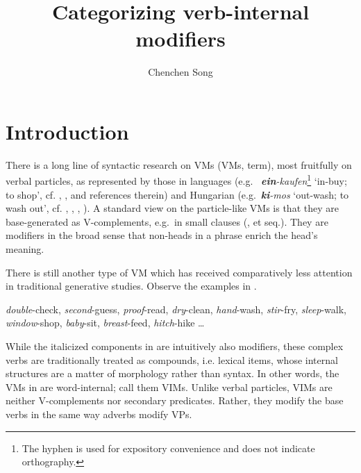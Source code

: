 \documentclass[output=paper]{langsci/langscibook}
\author{Chenchen Song\affiliation{University of Cambridge}}
\title{Categorizing verb-internal modifiers}
\begin{document}
\glsresetall

\section{Introduction}\label{sec1}

There is a long line of syntactic research on \glsdesc{VM}s
(\glspl{VM},  term), most fruitfully on verbal particles,
as represented by those in  languages (e.g.\ 
\textit{\textbf{ein}-kaufen}\footnote{The hyphen is used for expository
convenience and does not indicate orthography.} `in-buy; to shop', cf.
\citealt{DeheEtal2002}, \citealt{Haiden2006}, and references therein) and
Hungarian (e.g.\ \textit{\textbf{ki}-mos} `out-wash; to wash out', cf.
\citealt{Kiss1987}, \citeyear{Kiss2002}, \citeyear{Kiss2008},
\citealt{Hegedus2013}). A standard view on the particle-like \glspl{VM} is that they
are base-generated as V-complements, e.g.\ in small clauses
(\citealt{Taraldsen1983}, \citealt{Kayne1985} et seq.). They are
modifiers in the broad sense that non-heads in a phrase enrich the head's
meaning.

There is still another type of \gls{VM} which has received comparatively less
attention in traditional generative studies. Observe the examples in
.

\ea\label{ex:mod}
    \textit{double}-check, \textit{second}-guess, \textit{proof}-read,
    \textit{dry}-clean, \textit{hand}-wash, \textit{stir}-fry,
    \textit{sleep}-walk, \textit{window}-shop, \textit{baby}-sit,
    \textit{breast}-feed, \textit{hitch}-hike \dots
\z

\noindent While the italicized components in  are intuitively also
modifiers, these complex verbs are traditionally treated as compounds, i.e.
lexical items, whose internal structures are a matter of morphology rather than
syntax. In other words, the \glspl{VM} in  are word-internal; call them
\glspl{VIM}. Unlike verbal particles, \glspl{VIM} are neither V-complements nor
secondary predicates. Rather, they modify the base verbs in the same way
adverbs modify VPs.
\end{document}
